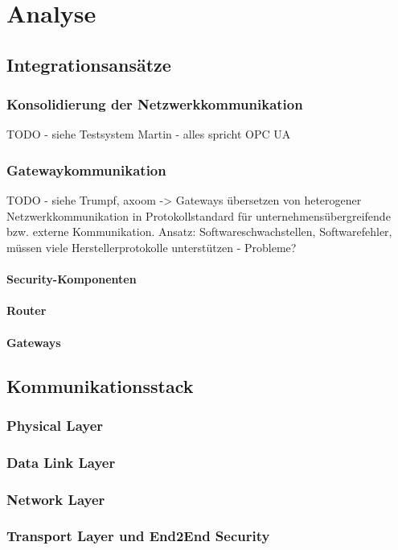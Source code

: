 \chapter{Analyse}

\section{Integrationsansätze}
\subsection{Konsolidierung der Netzwerkkommunikation}
TODO - siehe Testsystem Martin - alles spricht OPC UA

\subsection{Gatewaykommunikation}
TODO - siehe Trumpf, axoom -> Gateways übersetzen von heterogener Netzwerkkommunikation in Protokollstandard für unternehmensübergreifende bzw. externe Kommunikation.
Ansatz: Softwareschwachstellen, Softwarefehler, müssen viele Herstellerprotokolle unterstützen - Probleme?

\subsubsection{Security-Komponenten}
\subsubsection{Router}
\subsubsection{Gateways}

\section{Kommunikationsstack}
\subsection{Physical Layer}
\subsection{Data Link Layer}
\subsection{Network Layer}
\subsection{Transport Layer und End2End Security}
